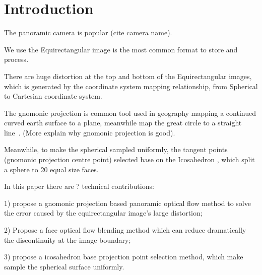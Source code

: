 \section{Introduction}
\label{sec:intro}

The panoramic camera is popular (cite camera name).

We use the Equirectangular image is the most common format to store and process.

There are huge distortion at the top and bottom of the Equirectangular images, which is generated by the coordinate system mapping relationship, from Spherical to Cartesian coordinate system.

The gnomonic projection is common tool used in geography mapping a continued curved earth surface to a plane, meanwhile map the great circle to a straight line~\cite{todo}. (More explain why gnomonic projection is good).

Meanwhile, to make the spherical sampled uniformly, the tangent points (gnomonic projection centre point) selected base on the Icosahedron , which split a sphere to 20 equal size faces.

In this paper there are ? technical contributions:

1) propose a gnomonic projection based panoramic optical flow method to solve the error caused by the equirectangular image's large distortion;

2) Propose a face optical flow blending method which can reduce dramatically the discontinuity at the image boundary;

3) propose a icosahedron base projection point selection method, which make sample the spherical surface uniformly.


